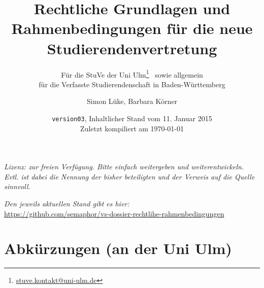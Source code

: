 \documentclass[
10pt,
a4paper,
twoside,								%
titlepage=false,							%
draft=false								%
]{scrartcl}
\begin{document}
\titlehead{\href{http://www.uni-ulm.de/stuve}{StuVe – StudierendenVertretung, uulm}}


\subject{}

\title{Rechtliche Grundlagen und Rahmenbedingungen für die neue Studierendenvertretung}

\subtitle{Für die StuVe der Uni Ulm\thanks{\href{mailto:stuve.kontakt@uni-ulm.de}{stuve.kontakt@uni-ulm.de}}~ sowie allgemein\\für die Verfasste Studierendenschaft in Baden-Württemberg}

\author{Simon Lüke, Barbara Körner}


\date{\texttt{version03}, Inhaltlicher Stand vom 11. Januar 2015\\Zuletzt kompiliert am \today}

\maketitle
\thispagestyle{empty}

\tableofcontents

\vfill

\begin{center}
	\textit{Lizenz: zur freien Verfügung. Bitte einfach weitergeben und weiterentwickeln. Evtl. ist dabei die Nennung der bisher beteiligten und der Verweis auf die Quelle sinnvoll.}

	\textit{Den jeweils aktuellen Stand gibt es hier:\\}
	\url{https://github.com/semaphor/vs-dossier-rechtlihe-rahmenbedingungen}
\end{center}



\newpage
\thispagestyle{empty}

\section*{Abkürzungen (an der Uni Ulm)}

\end{document}

